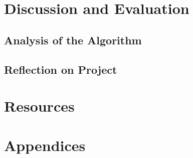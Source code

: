 \chapter{Discussion and Evaluation}
\section{Analysis of the Algorithm}

\section{Reflection on Project}

\chapter{Resources}




\chapter{Appendices}


